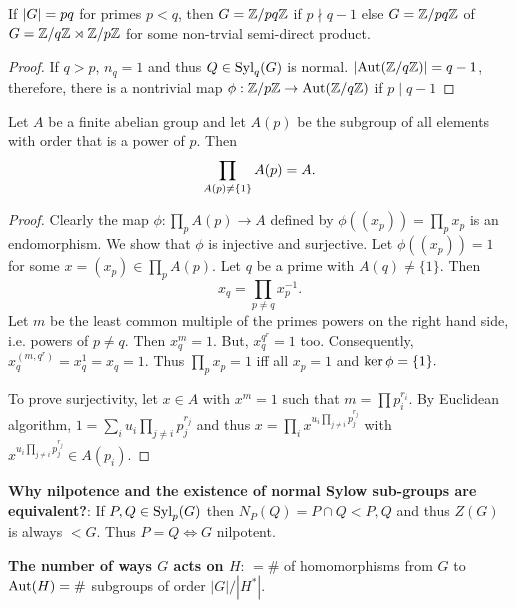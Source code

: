     \begin{theorem}
        If $|G|= pq$ for primes $p < q$, then $G = \mathbb{Z}/pq\mathbb{Z}$ if $p \nmid q - 1$ else $G = \mathbb{Z}/pq\mathbb{Z}$ of $G =  \mathbb{Z}/q\mathbb{Z} \rtimes \mathbb{Z}/p\mathbb{Z} $ for some non-trvial semi-direct product. 
    \end{theorem}

    \begin{proof}
        If $q > p$, $n_q = 1$ and thus $Q \in \text{Syl}_q(G)$ is normal. $|\text{Aut}(\mathbb{Z}/q\mathbb{Z})| = q - 1$, therefore, there is a nontrivial map $\phi: \mathbb{Z}/p\mathbb{Z}\to \text{Aut}(\mathbb{Z}/q\mathbb{Z})$ if $p \mid q - 1$  
    \end{proof}
    \begin{theorem}

        Let $A$ be a finite abelian group and let $A(p)$ be the subgroup of all elements with order that is a power of $p$. Then 
        $$\prod_{A(p) \neq \{1\}} A(p) = A.$$
    
    \end{theorem}

    \begin{proof}
        Clearly the map $\phi: \prod_p A(p) \to A$ defined by $\phi((x_p)) = \prod_p x_p $ is an endomorphism.  We show that $\phi$ is injective and surjective. Let $\phi((x_p)) = 1$ for some $x = (x_p) \in \prod_p A(p)$. Let $q$ be a prime with $A(q) \neq \{1\}$. Then 
        $$x_q = \prod_{ p \neq q} x_p^{-1}.$$
        Let $m$ be the least common multiple of the primes powers  on the right hand side, i.e. powers of $p \neq q$. Then $x^{m}_q = 1$. But, $x_q^{q^r} = 1$ too. Consequently, $x_q^{(m, q^r)} = x_q^{1} = x_q = 1$. Thus $\prod_p x_p = 1$ iff all $x_p = 1$ and $\ker \phi = \{1\}.$

        To prove surjectivity, let $x \in A$ with $x^m = 1$ such that $m = \prod p_i^{r_i}$. By Euclidean algorithm,  $1= \sum_i u_i\prod_{j\neq i} p_j^{r_j}$ and thus $x = \prod_i x^{u_i\prod_{j\neq i} p_j^{r_j}}$ with 
        $ x^{u_i \prod_{j\neq i} p_j^{r_j}} \in A(p_i).$
    \end{proof}
    
   
    \textbf{Why nilpotence and the existence of normal Sylow sub-groups are equivalent?}: If $P, Q \in \text{Syl}_p(G)$ then $N_P(Q) = P\cap Q < P, Q$ and thus $Z(G)$ is always $ < G$. Thus $P = Q \iff G$ nilpotent.  

    \textbf{The number of ways $G$ acts on $H$}: $= \#$ of homomorphisms from $G$ to $\text{Aut}(H) = \#$ subgroups of order $|G|/|H^*|.$ 


